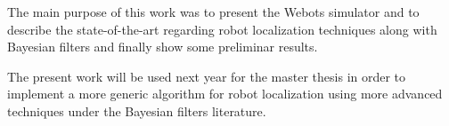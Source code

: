 The main purpose of this work was to present the Webots simulator and to describe the state-of-the-art regarding robot localization techniques along with Bayesian filters and finally show some preliminar results.

The present work will be used next year for the master thesis in order to implement a more generic algorithm for robot localization using more advanced techniques under the Bayesian filters literature. 

